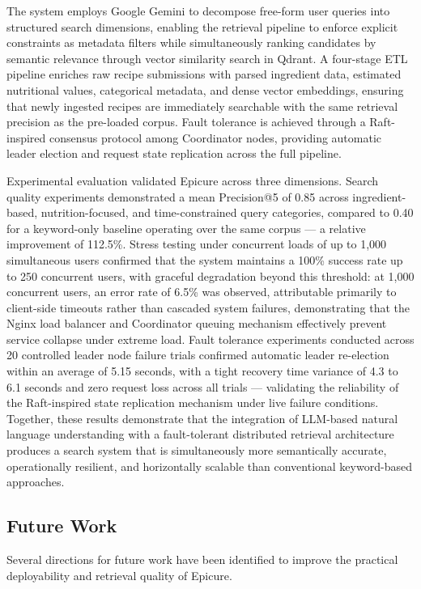\documentclass[conference]{IEEEtran}
\begin{document}
The system employs Google Gemini to decompose free-form user queries into structured search dimensions, enabling the retrieval pipeline to enforce explicit constraints as metadata filters while simultaneously ranking candidates by semantic relevance through vector similarity search in Qdrant. A four-stage ETL pipeline enriches raw recipe submissions with parsed ingredient data, estimated nutritional values, categorical metadata, and dense vector embeddings, ensuring that newly ingested recipes are immediately searchable with the same retrieval precision as the pre-loaded corpus. Fault tolerance is achieved through a Raft-inspired consensus protocol among Coordinator nodes, providing automatic leader election and request state replication across the full pipeline.

Experimental evaluation validated Epicure across three dimensions. Search quality experiments demonstrated a mean Precision@5 of 0.85 across ingredient-based, nutrition-focused, and time-constrained query categories, compared to 0.40 for a keyword-only baseline operating over the same corpus — a relative improvement of 112.5\%. Stress testing under concurrent loads of up to 1,000 simultaneous users confirmed that the system maintains a 100\% success rate up to 250 concurrent users, with graceful degradation beyond this threshold: at 1,000 concurrent users, an error rate of 6.5\% was observed, attributable primarily to client-side timeouts rather than cascaded system failures, demonstrating that the Nginx load balancer and Coordinator queuing mechanism effectively prevent service collapse under extreme load. Fault tolerance experiments conducted across 20 controlled leader node failure trials confirmed automatic leader re-election within an average of 5.15 seconds, with a tight recovery time variance of 4.3 to 6.1 seconds and zero request loss across all trials — validating the reliability of the Raft-inspired state replication mechanism under live failure conditions.
Together, these results demonstrate that the integration of LLM-based natural language understanding with a fault-tolerant distributed retrieval architecture produces a search system that is simultaneously more semantically accurate, operationally resilient, and horizontally scalable than conventional keyword-based approaches.

\subsection{Future Work}
Several directions for future work have been identified to improve the practical deployability and retrieval quality of Epicure.
\end{document}
